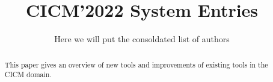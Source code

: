 \documentclass{llncs}
\title{CICM'2022 System Entries}
\author{Here we will put the consoldated list of authors}
\institute{And here the consolidated list of institutes}
\begin{document}
\maketitle



\begin{abstract}
This paper gives an overview of new tools and improvements of existing tools in the CICM domain.
\end{abstract}

\newpage



\newpage



\end{document}
